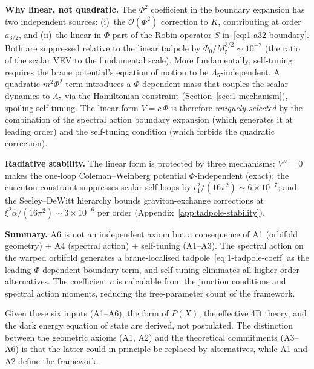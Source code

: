 \begin{remark}
\smallskip\noindent\textbf{Why linear, not quadratic.} The $\Phi^2$ coefficient in the boundary expansion has two independent sources: (i)~the $\mathcal{O}(\Phi^2)$ correction to $K$, contributing at order $a_{3/2}$, and (ii)~the linear-in-$\Phi$ part of the Robin operator $S$ in~\eqref{eq:1-a32-boundary}. Both are suppressed relative to the linear tadpole by $\Phi_0/M_5^{3/2} \sim 10^{-2}$ (the ratio of the scalar VEV to the fundamental scale). More fundamentally, self-tuning requires the brane potential's equation of motion to be $\Lambda_5$-independent. A quadratic $m^2\Phi^2$ term introduces a $\Phi$-dependent mass that couples the scalar dynamics to $\Lambda_5$ via the Hamiltonian constraint (Section~\ref{sec:1-mechanism}), spoiling self-tuning. The linear form $V = c\,\Phi$ is therefore \emph{uniquely selected} by the combination of the spectral action boundary expansion (which generates it at leading order) and the self-tuning condition (which forbids the quadratic correction).

\smallskip\noindent\textbf{Radiative stability.} The linear form is protected by three mechanisms: $V'' = 0$ makes the one-loop Coleman--Weinberg potential $\Phi$-independent (exact); the cuscuton constraint suppresses scalar self-loops by $\epsilon_1^2/(16\pi^2) \sim 6 \times 10^{-7}$; and the Seeley--DeWitt hierarchy bounds graviton-exchange corrections at $\xi^2\hat{\alpha}/(16\pi^2) \sim 3 \times 10^{-6}$ per order (Appendix~\ref{app:tadpole-stability}).

\smallskip\noindent\textbf{Summary.} A6 is not an independent axiom but a consequence of A1 (orbifold geometry) + A4 (spectral action) + self-tuning (A1--A3). The spectral action on the warped orbifold generates a brane-localised tadpole~\eqref{eq:1-tadpole-coeff} as the leading $\Phi$-dependent boundary term, and self-tuning eliminates all higher-order alternatives. The coefficient $c$ is calculable from the junction conditions and spectral action moments, reducing the free-parameter count of the framework.
\end{remark}

\medskip
\noindent Given these six inputs (A1--A6), the form of $P(X)$, the effective 4D theory, and the dark energy equation of state are derived, not postulated. The distinction between the geometric axioms (A1, A2) and the theoretical commitments (A3--A6) is that the latter could in principle be replaced by alternatives, while A1 and A2 define the framework.


